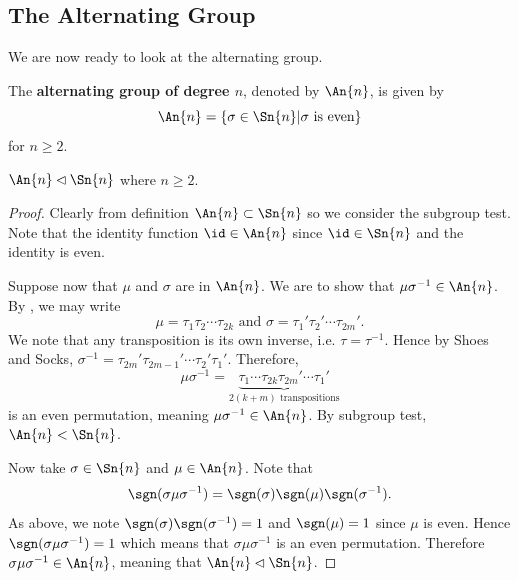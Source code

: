 \subsection{The Alternating Group}
We are now ready to look at the alternating group.
\begin{definition}
    The \textbf{alternating group of degree $n$}, denoted by $\An{n}$, is given by
    \[
        \An{n} = \left\{\sigma \in \Sn{n} \vert \sigma \text{ is even}\right\}
    \]
    for $n \geq 2$.
\end{definition}

\begin{proposition}\label{prop-An-normal-subgroup-of-Sn}
    $\An{n} \lhd \Sn{n}$ where $n \geq 2$.
\end{proposition}
\begin{proof}
    Clearly from definition $\An{n} \subset \Sn{n}$ so we consider the subgroup test. Note that the identity function $\id \in \An{n}$ since $\id \in \Sn{n}$ and the identity is even.

    Suppose now that $\mu$ and $\sigma$ are in $\An{n}$. We are to show that $\mu\sigma^{-1} \in \An{n}$. By , we may write
    \[
        \mu = \tau_1\tau_2\cdots\tau_{2k} \text{ and } \sigma = \tau_1'\tau_2'\cdots\tau_{2m}'.
    \]
    We note that any transposition is its own inverse, i.e. $\tau = \tau^{-1}$. Hence by Shoes and Socks, $\sigma^{-1} = \tau_{2m}'\tau_{2m-1}'\cdots\tau_2'\tau_1'$. Therefore,
    \[
        \mu\sigma^{-1} = \underbrace{\tau_1\cdots\tau_{2k}\tau_{2m}'\cdots\tau_1'}_{2(k+m) \text{ transpositions}}
    \]
    is an even permutation, meaning $\mu\sigma^{-1} \in \An{n}$. By subgroup test, $\An{n} < \Sn{n}$.
    
    Now take $\sigma \in \Sn{n}$ and $\mu \in \An{n}$. Note that
    \[
        \sgn(\sigma\mu\sigma^{-1}) = \sgn(\sigma)\sgn(\mu)\sgn(\sigma^{-1}).
    \]
    As above, we note $\sgn(\sigma)\sgn(\sigma^{-1}) = 1$ and $\sgn(\mu) = 1$ since $\mu$ is even. Hence $\sgn(\sigma\mu\sigma^{-1}) = 1$ which means that $\sigma\mu\sigma^{-1}$ is an even permutation. Therefore $\sigma\mu\sigma^{-1} \in \An{n}$, meaning that $\An{n} \lhd \Sn{n}$.
\end{proof}


